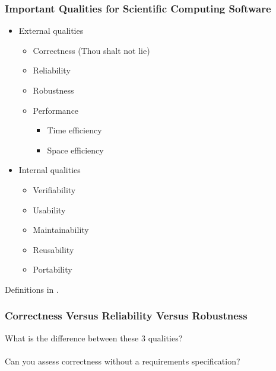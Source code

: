 \documentclass[t,12pt,numbers,fleqn]{beamer}
\begin{document}
\begin{frame}

\frametitle{Important Qualities for Scientific Computing Software}

\begin{itemize}

\item External qualities
\begin{itemize}
\item Correctness (Thou shalt not lie)
\item Reliability
\item Robustness
\item Performance
\begin{itemize}
\item Time efficiency
\item Space efficiency
\end{itemize}
\end{itemize}

\item Internal qualities
\begin{itemize}
\item Verifiability
\item Usability
\item Maintainability
\item Reusability
\item Portability
\end{itemize}

\end{itemize}

Definitions in \cite{GhezziEtAl2003}.

\end{frame}


\begin{frame}
\frametitle{Correctness Versus Reliability Versus Robustness}

What is the difference between these 3 qualities?\\
~\\
Can you assess correctness without a requirements specification?

\end{frame}
\end{document}
